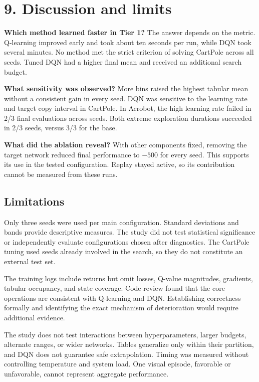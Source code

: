 \documentclass[10pt,a4paper,twocolumn]{extarticle}
\begin{document}
\newpage
\section*{9. Discussion and limits}
\textbf{Which method learned faster in Tier 1?} The answer depends on the metric. Q-learning improved early and took about ten seconds per run, while DQN took several minutes. No method met the strict criterion of solving CartPole across all seeds. Tuned DQN had a higher final mean and received an additional search budget.

\textbf{What sensitivity was observed?} More bins raised the highest tabular mean without a consistent gain in every seed. DQN was sensitive to the learning rate and target copy interval in CartPole. In Acrobot, the high learning rate failed in 2/3 final evaluations across seeds. Both extreme exploration durations succeeded in 2/3 seeds, versus 3/3 for the base.

\textbf{What did the ablation reveal?} With other components fixed, removing the target network reduced final performance to $-500$ for every seed. This supports its use in the tested configuration. Replay stayed active, so its contribution cannot be measured from these runs.

\subsection*{Limitations}
Only three seeds were used per main configuration. Standard deviations and bands provide descriptive measures. The study did not test statistical significance or independently evaluate configurations chosen after diagnostics. The CartPole tuning used seeds already involved in the search, so they do not constitute an external test set.

The training logs include returns but omit losses, Q-value magnitudes, gradients, tabular occupancy, and state coverage. Code review found that the core operations are consistent with Q-learning and DQN. Establishing correctness formally and identifying the exact mechanism of deterioration would require additional evidence.

The study does not test interactions between hyperparameters, larger budgets, alternate ranges, or wider networks. Tables generalize only within their partition, and DQN does not guarantee safe extrapolation. Timing was measured without controlling temperature and system load. One visual episode, favorable or unfavorable, cannot represent aggregate performance.
\end{document}
